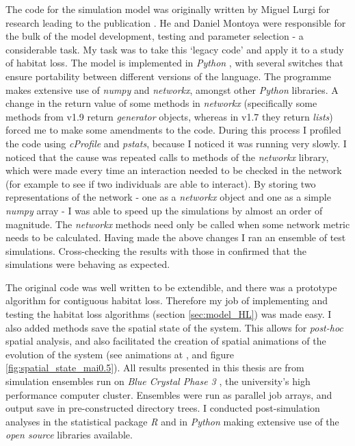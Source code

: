 The code for the simulation model was originally written by Miguel Lurgi for research leading to the publication \cite{lurgi2015effects}. He and Daniel Montoya were responsible for the bulk of the model development, testing and parameter selection - a considerable task. My task was to take this `legacy code' and apply it to a study of habitat loss. The model is implemented in \emph{Python} \cite{python}, with several switches that ensure portability between different versions of the language. The programme makes extensive use of \emph{numpy} and \emph{networkx}, amongst other \emph{Python} libraries. A change in the return value of some methods in \emph{networkx} (specifically some methods from v1.9 return \emph{generator} objects, whereas in v1.7 they return \emph{lists}) forced me to make some amendments to the code. During this process I profiled the code using \emph{cProfile} and \emph{pstats}, because I noticed it was running very slowly. I noticed that the cause was repeated calls to methods of the \emph{networkx} library, which were made every time an interaction needed to be checked in the network (for example to see if two individuals are able to interact). By storing two representations of the network - one as a \emph{networkx} object and one as a simple \emph{numpy} array - I was able to speed up the simulations by almost an order of magnitude. The \emph{networkx} methods need only be called when some network metric needs to be calculated. Having made the above changes I ran an ensemble of test simulations. Cross-checking the results with those in \cite{lurgi2015effects} confirmed that the simulations were behaving as expected.    

The original code was well written to be extendible, and there was a prototype algorithm for contiguous habitat loss. Therefore my job of implementing and testing the habitat loss algorithms (section \ref{sec:model_HL}) was made easy. I also added methods save the spatial state of the system. This allows for \emph{post-hoc} spatial analysis, and also facilitated the creation of spatial animations of the evolution of the system (see animations at \cite{mcwilliams2015anim}, and figure \ref{fig:spatial_state_mai0.5}). All results presented in this thesis are from simulation ensembles run on \emph{Blue Crystal Phase 3} \cite{BC3}, the university's high performance computer cluster. Ensembles were run as parallel job arrays, and output save in pre-constructed directory trees. I conducted post-simulation analyses in the statistical package \emph{R} \cite{Rlanguage} and in \emph{Python} making extensive use of the \emph{open source} libraries available.



